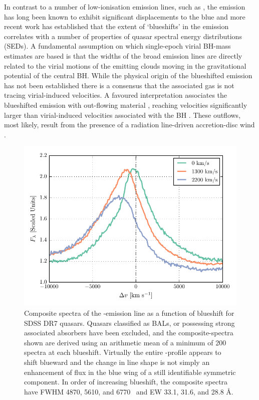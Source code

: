 In contrast to a number of low-ionisation emission lines, such as , the  emission has long been known to exhibit significant displacements to the blue \citep{gaskell82} and more recent work \citep[e.g.][]{sulentic00a, richards11} has established that the extent of `blueshifts' in the  emission correlates with a number of properties of quasar spectral energy distributions (SEDs). 
A fundamental assumption on which single-epoch virial BH-mass estimates are based is that the widths of the broad emission lines are directly related to the virial motions of the emitting clouds moving in the gravitational potential of the central BH. 
While the physical origin of the blueshifted emission has not been established there is a consensus that the associated gas is not tracing virial-induced velocities.  
A favoured interpretation associates the blueshifted emission with out-flowing material \citep[see][for a recent review]{netzer15}, reaching velocities significantly larger than virial-induced velocities associated with the BH \citep[e.g.][]{sulentic07, richards11}.
These outflows, most likely, result from the presence of a radiation line-driven accretion-disc wind \citep[e.g.][]{konigl94, murray95, proga00, everett05, gallagher15,higginbottom15}.  

\begin{figure}
    \centering
    \includegraphics[width=0.9\linewidth]{figures/chapter03/civ_composites.pdf}
    \caption{Composite spectra of the -emission line as a function of  blueshift for SDSS DR7 quasars. Quasars classified as BALs, or possessing strong associated absorbers have been excluded, and the composite-spectra shown are derived using an arithmetic mean of a minimum of 200 spectra at each blueshift. Virtually the entire -profile appears to shift blueward and the change in line shape is not simply an enhancement of flux in the blue wing of a still identifiable symmetric component. In order of increasing  blueshift, the composite spectra have FWHM 4870, 5610, and 6770 \kms\, and EW 33.1, 31.6, and 28.8 \AA.}
    \label{fig:civ_composites}
\end{figure}

